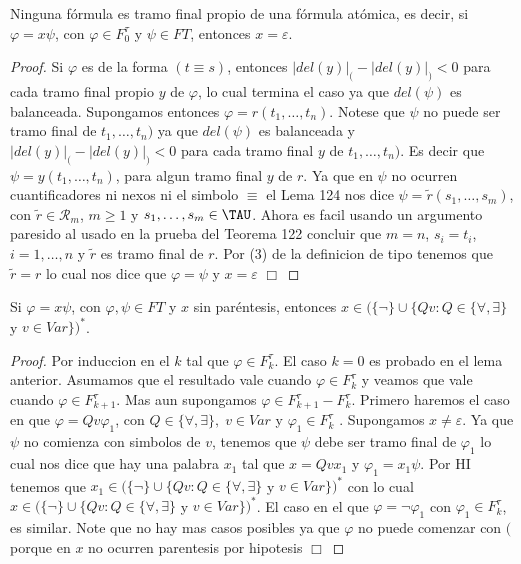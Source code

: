   \begin{lemma}
    \PN Ninguna fórmula es tramo final propio de una fórmula atómica, es decir, si $\varphi = x \psi$, con $\varphi \in
    F_{0}^{\tau}$ y $\psi \in FT$, entonces $x = \varepsilon$.
  \end{lemma}
  \begin{proof}
    Si $\varphi $ es de la forma $(t\equiv s)$, entonces $\lvert del(y)\rvert_{(}-\lvert del(y)\rvert_{)}< 0$ para cada tramo final propio $y$ de $\varphi $, lo cual termina el caso ya que $del(\psi )$ es balanceada. Supongamos entonces $\varphi =r(t_{1}, \dotsc,t_{n})$. Notese que $\psi $ no puede ser tramo final de $t_{1}, \dotsc,t_{n})$ ya que $del(\psi )$ es balanceada y $\lvert del(y)\rvert_{(}-\lvert del(y)\rvert_{)}< 0$ para cada tramo final $y$ de $t_{1}, \dotsc,t_{n})$. Es decir que $\psi =y(t_{1}, \dotsc,t_{n})$, para algun tramo final $y$ de $r$. Ya que en $\psi $ no ocurren cuantificadores ni nexos ni el simbolo $\equiv $ el Lema 124 nos dice $\psi =\tilde{r}(s_{1}, \dotsc,s_{m})$, con $ \tilde{r}\in \mathcal{R}_{m}$, $m\geq 1$ y $s_{1}, \dotsc,s_{m}\in \TAU$. Ahora es facil usando un argumento paresido al usado en la prueba del Teorema 122 concluir que $m=n$, $s_{i}=t_{i}$, $ i=1, \dotsc,n$ y $\tilde{r}$ es tramo final de $r$. Por (3) de la definicion de tipo tenemos que $\tilde{r}=r$ lo cual nos dice que $\varphi =\psi $ y $ x=\varepsilon $ $\Box$
  \end{proof}

  \begin{lemma}
    \PN Si $\varphi = x \psi$, con $\varphi, \psi \in FT$ y $x$ sin paréntesis, entonces $x \in (\{\lnot\} \cup
    \{Qv: Q \in \{\forall, \exists\}$ y $v \in Var\})^{\ast}$.
  \end{lemma}
  \begin{proof}
    Por induccion en el $k$ tal que $\varphi \in F_{k}^{\tau }$. El caso $k=0$ es probado en el lema anterior. Asumamos que el resultado vale cuando $ \varphi \in F_{k}^{\tau }$ y veamos que vale cuando $\varphi \in F_{k+1}^{\tau }$. Mas aun supongamos $\varphi \in F_{k+1}^{\tau }-F_{k}^{\tau }$. Primero haremos el caso en que $\varphi =Qv\varphi_{1}$, con $Q\in \{\forall ,\exists \},\;v\in Var$ y $\varphi_{1}\in F_{k}^{\tau }$ . Supongamos $x\neq \varepsilon $. Ya que $\psi $ no comienza con simbolos de $v$, tenemos que $\psi $ debe ser tramo final de $\varphi_{1}$ lo cual nos dice que hay una palabra $x_{1}$ tal que $x=Qvx_{1}$ y $\varphi_{1}=x_{1}\psi $. Por HI tenemos que $x_{1}\in (\{\lnot \}\cup \{Qv:Q\in \{\forall ,\exists \}$ y $v\in Var\})^{\ast }$ con lo cual $x\in (\{\lnot \}\cup \{Qv:Q\in \{\forall ,\exists \}$ y $v\in Var\})^{\ast }$. El caso en el que $\varphi =\lnot \varphi_{1}$ con $\varphi_{1}\in F_{k}^{\tau }$, es similar. Note que no hay mas casos posibles ya que $\varphi $ no puede comenzar con $($ porque en $x$ no ocurren parentesis por hipotesis $\Box$
  \end{proof}

